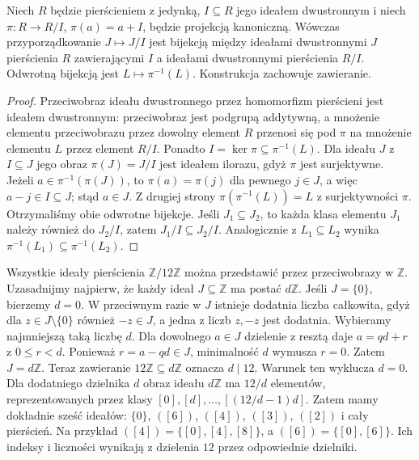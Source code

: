 \begin{twierdzenie}
\label{aa:tw:ring-ideal-correspondence}
Niech $R$ będzie pierścieniem z jedynką, $I\subseteq R$
jego ideałem dwustronnym i niech
$\pi:R\to R/I$, $\pi(a)=a+I$, będzie projekcją kanoniczną.
Wówczas przyporządkowanie $J\mapsto J/I$ jest bijekcją
między ideałami dwustronnymi $J$ pierścienia $R$
zawierającymi $I$ a ideałami dwustronnymi pierścienia $R/I$.
Odwrotną bijekcją jest $L\mapsto\pi^{-1}(L)$.
Konstrukcja zachowuje zawieranie.
\end{twierdzenie}
\begin{proof}
Przeciwobraz ideału dwustronnego przez homomorfizm pierścieni
jest ideałem dwustronnym: przeciwobraz jest podgrupą addytywną,
a mnożenie elementu przeciwobrazu przez dowolny element
$R$ przenosi się pod $\pi$ na mnożenie elementu $L$
przez element $R/I$. Ponadto $I=\ker\pi\subseteq\pi^{-1}(L)$.
Dla ideału $J$ z $I\subseteq J$ jego obraz $\pi(J)=J/I$
jest ideałem ilorazu, gdyż $\pi$ jest surjektywne.
Jeżeli $a\in\pi^{-1}(\pi(J))$, to $\pi(a)=\pi(j)$
dla pewnego $j\in J$, a więc $a-j\in I\subseteq J$;
stąd $a\in J$. Z drugiej strony $\pi(\pi^{-1}(L))=L$
z surjektywności $\pi$. Otrzymaliśmy obie odwrotne bijekcje.
Jeśli $J_1\subseteq J_2$, to każda klasa elementu $J_1$
należy również do $J_2/I$, zatem $J_1/I\subseteq J_2/I$.
Analogicznie z $L_1\subseteq L_2$ wynika
$\pi^{-1}(L_1)\subseteq\pi^{-1}(L_2)$.
\end{proof}

\begin{przyklad}
\label{aa:prz:ideals-z12}
Wszystkie ideały pierścienia $\mathbb Z/12\mathbb Z$ można przedstawić
przez przeciwobrazy w $\mathbb Z$. Uzasadnijmy najpierw, że każdy ideał $J\subseteq\mathbb Z$ ma postać
$d\mathbb Z$. Jeśli $J=\{0\}$, bierzemy $d=0$. W przeciwnym
razie w $J$ istnieje dodatnia liczba całkowita, gdyż dla
$z\in J\setminus\{0\}$ również $-z\in J$,
a jedna z liczb $z,-z$ jest dodatnia. Wybieramy najmniejszą
taką liczbę $d$. Dla dowolnego $a\in J$ dzielenie z resztą daje
$a=qd+r$ z $0\le r<d$. Ponieważ $r=a-qd\in J$,
minimalność $d$ wymusza $r=0$. Zatem $J=d\mathbb Z$.
Teraz zawieranie $12\mathbb Z\subseteq d\mathbb Z$ oznacza
$d\mid12$. Warunek ten wyklucza $d=0$.
Dla dodatniego dzielnika $d$ obraz ideału $d\mathbb Z$ ma
$12/d$ elementów, reprezentowanych przez klasy
$[0],[d],\ldots,[(12/d-1)d]$. Zatem mamy dokładnie sześć ideałów:
$\{0\}$, $([6])$, $([4])$, $([3])$, $([2])$ i cały pierścień.
Na przykład $([4])=\{[0],[4],[8]\}$, a
$([6])=\{[0],[6]\}$. Ich indeksy i liczności wynikają
z dzielenia $12$ przez odpowiednie dzielniki.
\end{przyklad}

